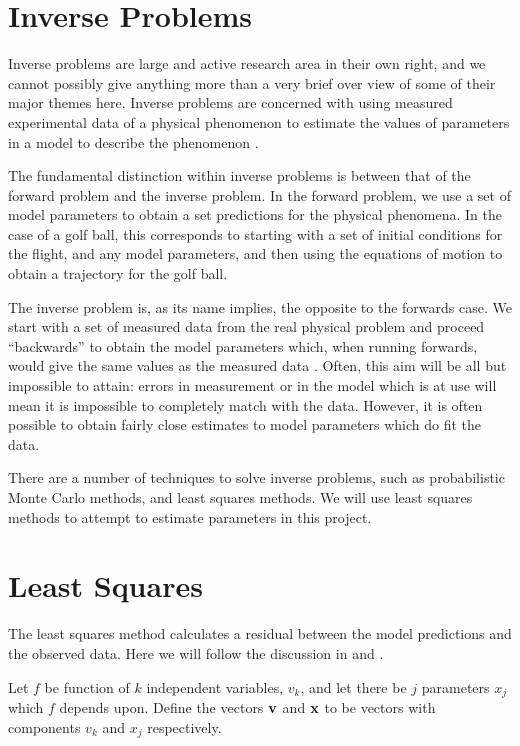 \section{Inverse Problems} \label{inverse}

Inverse problems are large and active research area in their own right, and we cannot possibly give
anything more than a very brief over view of some of their major themes here. Inverse problems
are concerned with using measured experimental data of a physical phenomenon to estimate the values
of parameters in a model to describe the phenomenon \citet{Tarantola2005}. 

The fundamental distinction within inverse problems is between that of the forward problem and the
inverse problem. In the forward problem, we use a set of model parameters to obtain a set predictions
for the physical phenomena. In the case of a golf ball, this corresponds to starting with a set
of initial conditions for the flight, and any model parameters, and then using the equations of motion
to obtain a trajectory for the golf ball.

The inverse problem is, as its name implies, the opposite to the forwards case. We start with a set of measured
data from the real physical problem and proceed ``backwards'' to obtain the model parameters which, when
running forwards, would give the same values as the measured data \citet{Tarantola2005,Tarantola1982}.
Often, this aim will be all but impossible to attain: errors in measurement or in the model which
is at use will mean it is impossible to completely match with the data. However, it is often possible
to obtain fairly close estimates to model parameters which do fit the data.

There are a number of techniques to solve inverse problems, such as probabilistic Monte Carlo methods, 
and least squares methods. We will use least squares methods to attempt to estimate parameters in this
project. 

\section{Least Squares} \label{ls}

The least squares method calculates a residual between the model predictions and the observed data.
Here we will follow the discussion in \citet{Pujol2007} and \citet{Nocedal}.

Let $f$ be function of $k$ independent variables, $v_k$, and let there be $j$ parameters $x_j$ which
$f$ depends upon. Define the vectors $\mathbf{v}$ and $\mathbf{x}$ to be vectors with components $v_k$ and $x_j$
respectively.

